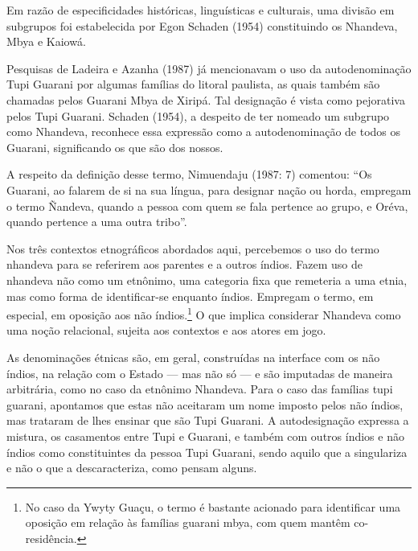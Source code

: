 Em razão de especificidades históricas, linguísticas e culturais, uma
divisão em subgrupos foi estabelecida por Egon Schaden (1954)
constituindo os Nhandeva, Mbya e Kaiowá.

Pesquisas de Ladeira e Azanha (1987) já mencionavam o uso da
autodenominação Tupi Guarani por algumas famílias do litoral paulista,
as quais também são chamadas pelos Guarani Mbya de Xiripá. Tal
designação é vista como pejorativa pelos Tupi Guarani. Schaden (1954),
a despeito de ter nomeado um subgrupo como Nhandeva, reconhece essa
expressão como a autodenominação de todos os Guarani, significando os
que são dos nossos.

A respeito da definição desse termo, Nimuendaju (1987: 7) comentou: ``Os
Guarani, ao falarem de si na sua língua, para designar nação ou horda,
empregam o termo Ñandeva, quando a pessoa com quem se fala pertence ao
grupo, e Oréva, quando pertence a uma outra tribo''.

Nos três contextos etnográficos abordados aqui, percebemos o uso do
termo nhandeva para se referirem aos parentes e a outros índios. Fazem
uso de nhandeva não como um etnônimo, uma categoria fixa que remeteria
a uma etnia, mas como forma de identificar-se enquanto índios. Empregam
o termo, em especial, em oposição aos não índios.\footnote{No caso da
Ywyty Guaçu, o termo é bastante acionado para identificar uma oposição
em relação às famílias guarani mbya, com quem mantêm co-residência.} O
que implica considerar Nhandeva como uma noção relacional, sujeita aos
contextos e aos atores em jogo.

As denominações étnicas são, em geral, construídas na interface com os
não índios, na relação com o Estado — mas não só — e são imputadas de
maneira arbitrária, como no caso da etnônimo Nhandeva. Para o caso das
famílias tupi guarani, apontamos que estas não aceitaram um nome
imposto pelos não índios, mas trataram de lhes ensinar que são Tupi
Guarani. A autodesignação expressa a mistura, os casamentos entre Tupi
e Guarani, e também com outros índios e não índios como constituintes
da pessoa Tupi Guarani, sendo aquilo que a singulariza e não o que a
descaracteriza, como pensam alguns.

